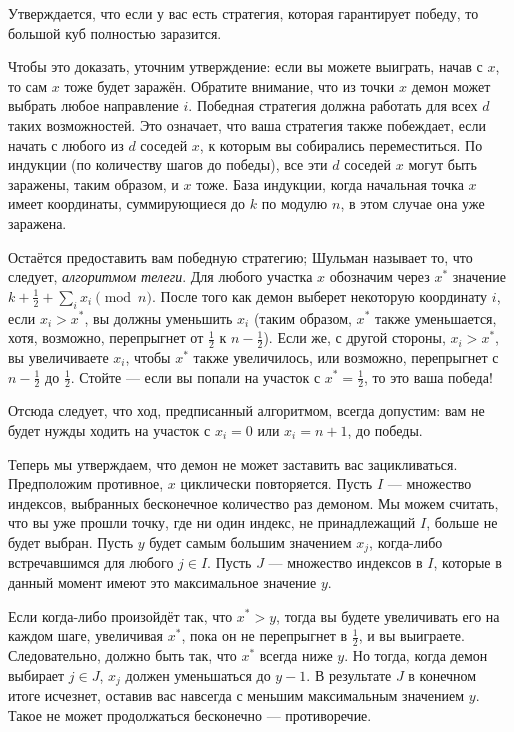 Утверждается, что если у вас есть стратегия, которая гарантирует победу, то большой куб полностью заразится.

Чтобы это доказать, уточним утверждение: если вы можете выиграть, начав с $x$, то сам $x$ тоже будет заражён.
Обратите внимание, что из точки $x$ демон может выбрать любое направление $i$.
Победная стратегия должна работать для всех $d$ таких возможностей.
Это означает, что ваша стратегия также побеждает, если начать с любого из $d$ соседей $x$, к которым вы собирались переместиться.
По индукции (по количеству шагов до победы), все эти $d$ соседей $x$ могут быть заражены, таким образом, и $x$ тоже.
База индукции, когда начальная точка $x$ имеет координаты, суммирующиеся до $k$ по модулю $n$, в этом случае она уже заражена.

Остаётся предоставить вам победную стратегию; Шульман называет то, что следует, \emph{алгоритмом телеги}.
Для любого участка $x$ обозначим через $x^*$ значение $k + \tfrac12 + \sum_i x_i \pmod n$.
После того как демон выберет некоторую координату $i$, если $x_i > x^*$, вы должны уменьшить $x_i$ (таким образом, $x^*$ также уменьшается, хотя, возможно, перепрыгнет от $\tfrac12$ к $n - \tfrac12$).
Если же, с другой стороны, $x_i > x^*$, вы увеличиваете $x_i$, чтобы $x^*$ также увеличилось, или возможно, перепрыгнет с $n - \tfrac12$ до $\tfrac12$.
Стойте --- если вы попали на участок с $x^* = \tfrac12$, то это ваша победа!

Отсюда следует, что ход, предписанный алгоритмом, всегда допустим:
вам не будет нужды ходить на участок с $x_i = 0$ или $x_i = n + 1$, до победы.

Теперь мы утверждаем, что демон не может заставить вас зацикливаться.
Предположим противное, $x$ циклически повторяется.
Пусть $I$ --- множество индексов, выбранных бесконечное количество раз демоном.
Мы можем считать, что вы уже прошли точку, где ни один индекс, не принадлежащий $I$, больше не будет выбран.
Пусть $y$ будет самым большим значением $x_j$, когда-либо встречавшимся для любого $j \in I$.
Пусть $J$ --- множество индексов в $I$, которые в данный момент имеют это максимальное значение $y$.

Если когда-либо произойдёт так, что $x^* > y$, тогда вы будете увеличивать его на каждом шаге, увеличивая $x^*$, пока он не перепрыгнет в $\tfrac12$, и вы выиграете.
Следовательно, должно быть так, что $x^*$ всегда ниже $y$.
Но тогда, когда демон выбирает $j \in J$, $x_j$ должен уменьшаться до $y - 1$.
В результате $J$ в конечном итоге исчезнет, оставив вас навсегда с меньшим максимальным значением $y$.
Такое не может продолжаться бесконечно --- противоречие.

